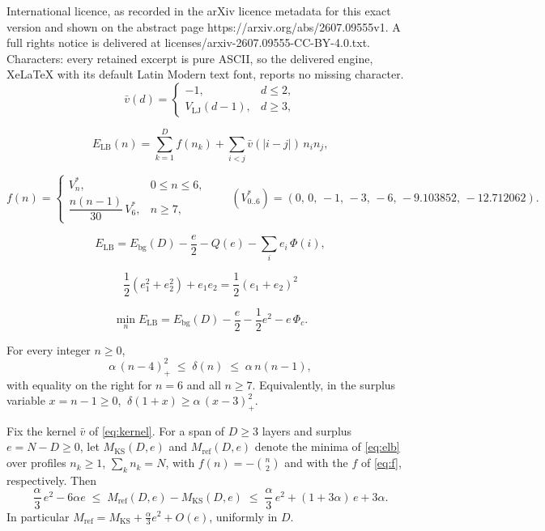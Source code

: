 \documentclass[10pt,a4paper]{amsart}
\newcommand{\KS}{\mathrm{KS}}
\newcommand{\LB}{\mathrm{LB}}
\newcommand{\bg}{\mathrm{bg}}
\newcommand{\refi}{\mathrm{ref}}
\begin{document}
International licence, as recorded in the arXiv licence metadata for this exact version and shown on the abstract page https://arxiv.org/abs/2607.09555v1. A full rights notice is delivered at licenses/arxiv-2607.09555-CC-BY-4.0.txt. Characters: every retained excerpt is pure ASCII, so the delivered engine, XeLaTeX with its default Latin Modern text font, reports no missing character.
\begin{equation}\label{eq:kernel}
\bar v(d) =
\begin{cases}
-1, & d\le 2,\\
V_{\mathrm{LJ}}(d-1), & d\ge 3,
\end{cases}
\end{equation}

\begin{equation}\label{eq:elb}
E_\LB(n) = \sum_{k=1}^D f(n_k) + \sum_{i<j} \bar v(|i-j|)\, n_i n_j,
\end{equation}

\begin{equation}\label{eq:f}
f(n) =
\begin{cases}
V^*_n, & 0\le n\le 6,\\[4pt]
\dfrac{n(n-1)}{30}\, V^*_6, & n\ge 7,
\end{cases}
\qquad
(V^*_{0..6}) = (0,\,0,\,-1,\,-3,\,-6,\,-9.103852,\,-12.712062).
\end{equation}

\begin{equation}\label{eq:elbsplit}
E_\LB = E_\bg(D) - \frac e2 - Q(e) - \sum_i e_i\,\Phi(i),
\end{equation}

\begin{equation}\label{eq:square}
\frac12(e_1^2+e_2^2)+e_1 e_2 = \frac12(e_1+e_2)^2
\end{equation}

\begin{equation}\label{eq:minelb}
\min_n E_\LB = E_\bg(D) - \frac e2 - \frac12 e^2 - e\,\Phi_c.
\end{equation}

\begin{lemma}\label{lem:penalty}
For every integer $n\ge0$,
\[
\alpha\,(n-4)_+^2 \;\le\; \delta(n) \;\le\; \alpha\,n(n-1),
\]
with equality on the right for $n=6$ and all $n\ge7$. Equivalently, in the surplus variable $x=n-1\ge0$, $\ \delta(1+x)\ge\alpha\,(x-3)_+^2$.
\end{lemma}

\begin{proposition}\label{prop:gap}
Fix the kernel $\bar v$ of \eqref{eq:kernel}. For a span of $D\ge3$ layers and surplus $e=N-D\ge0$, let $M_\KS(D,e)$ and $M_\refi(D,e)$ denote the minima of \eqref{eq:elb} over profiles $n_k\ge1$, $\sum_k n_k=N$, with $f(n)=-\binom n2$ and with the $f$ of \eqref{eq:f}, respectively. Then
\[
\frac\alpha3\,e^2 - 6\alpha e
\;\le\;
M_\refi(D,e)-M_\KS(D,e)
\;\le\;
\frac\alpha3\,e^2 + (1+3\alpha)\,e + 3\alpha.
\]
In particular $M_\refi=M_\KS+\frac\alpha3 e^2+O(e)$, uniformly in $D$.
\end{proposition}
\end{document}

